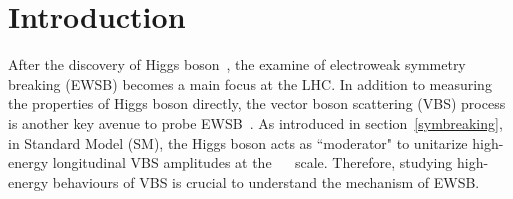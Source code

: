 \section{Introduction}

After the discovery of Higgs boson~\cite{20121, 201230}, the examine of electroweak symmetry breaking (EWSB) becomes a main focus at the LHC.
In addition to measuring the properties of Higgs boson directly, the vector boson scattering (VBS) process is another key avenue to probe EWSB~\cite{Lee:1977yc, Chanowitz:1985hj, Szleper:2014xxa}.
As introduced in section~\ref{symbreaking}, in Standard Model (SM), the Higgs boson acts as ``moderator" to unitarize high-energy longitudinal VBS amplitudes at the ~\tev~ scale.
Therefore, studying high-energy behaviours of VBS is crucial to understand the mechanism of EWSB.

